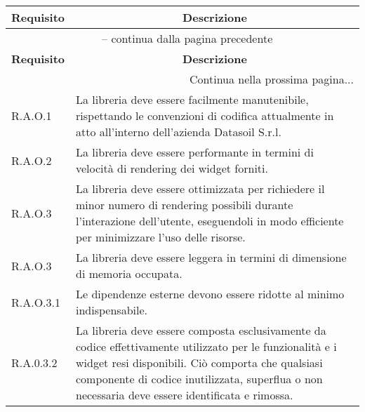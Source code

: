 \begin{center}
    \begin{longtable}{|p{2.5cm}|p{10cm}|}
        \hline
        \rowcolor{gray!30}
        \textbf{Requisito} & \multicolumn{1}{c|}{\textbf{Descrizione}}                                                                                    \\
        \hline
        \endfirsthead
        \hline
        \multicolumn{2}{|c|}{{\tablename\ \thetable{} -- continua dalla pagina precedente}}                                                               \\
        \hline
        \rowcolor{gray!30}
        \textbf{Requisito} & \multicolumn{1}{c|}{\textbf{Descrizione}}                                                                                    \\
        \endhead
        \hline
        \multicolumn{2}{|r|}{{Continua nella prossima pagina...}}                                                                                         \\
        \hline
        \endfoot
        \hline
        \endlastfoot
        \hline
        R.A.O.1            & La libreria deve essere facilmente manutenibile, rispettando le convenzioni di codifica
        attualmente in atto all'interno dell'azienda Datasoil S.r.l.                                                                                      \\
        \hline
        R.A.O.2            & La libreria deve essere performante in termini di velocità di rendering dei widget forniti.                                  \\
        \hline
        R.A.O.3            & La libreria deve essere ottimizzata per richiedere il minor numero di rendering possibili durante l'interazione dell'utente,
        eseguendoli in modo efficiente per minimizzare l'uso delle risorse.                                                                               \\
        \hline
        R.A.O.3            & La libreria deve essere leggera in termini di dimensione di memoria occupata.                                                \\
        \hline
        R.A.O.3.1          & Le dipendenze esterne devono essere ridotte al minimo indispensabile.                                                        \\
        \hline
        R.A.0.3.2          & La libreria deve essere composta esclusivamente da codice effettivamente utilizzato per le funzionalità e i widget resi
        disponibili. Ciò comporta che qualsiasi componente di codice inutilizzata, superflua o non necessaria deve essere identificata e rimossa.         \\
    \end{longtable}
    \label{tab:requisiti_qualitativi}
\end{center}

